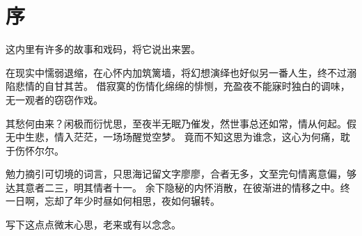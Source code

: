 \part{序}

\vspace*{2\ccwd}

\hspace*{2em} 这内里有许多的故事和戏码，将它说出来罢。

\vspace*{\ccwd}

\hspace*{2em} 在现实中懦弱退缩，在心怀内加筑篱墙，将幻想演绎也好似另一番人生，终不过溺陷悲情的自甘其苦。
借寂寞的伤情化绵绵的悱恻，充盈夜不能寐时独白的调味，无一观者的窃窃作戏。

\vspace*{\ccwd}

\hspace*{2em} 其愁何由来？闲极而衍忧思，至夜半无眠乃催发，然世事总还如常，情从何起。假无中生悲，情入茫茫，一场场醒觉空梦。
竟而不知这思为谁念，这心为何痛，耽于伤怀尔尔。

\vspace*{\ccwd}

\hspace*{2em} 勉力摘引可切境的词言，只思海记留文字廖廖，合者无多，文至完句情离意偏，够达其意者二三，明其情者十一。
余下隐秘的内怀消散，在彼渐进的情移之中。终一日啊，忘却了年少时昼如何相思，夜如何辗转。

\vspace*{\ccwd}

\hspace*{2em} 写下这点点微末心思，老来或有以念念。

\newpage